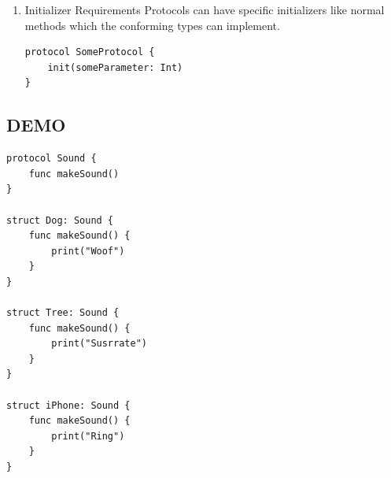 \documentclass[a4paper,12pt]{article}
\begin{document}
\begin{enumerate}
\begin{lstlisting}
    func area() -> Int {
        return width * height
    }

    mutating func scaleBy(value: Int) {
        width *= value
        height *= value
    }
}
\end{lstlisting}
The scaleBy(value:) method modifies the value of width and height. So it should be marked as mutating. Otherwise the compiler will throw error at you.\\

\begin{verse}
If you mark a protocol instance method requirement as mutating, you do not need to write the mutatingkeyword when writing an implementation of that method for a class. The mutating keyword is only used by structures and enumerations.\\
\end{verse}
Consider an enum and class implementing a protocol with mutating function:\\
\lstset{breaklines=true,language=swift,label= ,caption= ,captionpos=b,firstnumber=1,numbers=left}
\begin{lstlisting}
protocol Togglable {
    mutating func toggle()
}

enum OnOffSwitch: Toggglable {
    case off, on
    mutating func toggle() {
        switch self {
        case .off:
            self = .on
        case .on:
            self = .off
        }
    }
}

var lightSwitch = OnOffSwitch.off
lightSwitch.toggle()

class ToggleClass: Togglable {
    var someBool = false
    func toggle() {
        someBool = true
    }
}

let toggleClassObj = ToggleClass()
toggleClassObj.toggle()
\end{lstlisting}
\item Initializer Requirements
\label{sec:org9c66597}
Protocols can have specific initializers like normal methods which the conforming types can implement.\\
\lstset{breaklines=true,language=swift,label= ,caption= ,captionpos=b,firstnumber=1,numbers=left}
\begin{lstlisting}
protocol SomeProtocol {
    init(someParameter: Int)
}
\end{lstlisting}
\end{enumerate}
\subsection{DEMO}
\label{sec:org8be615d}
\lstset{breaklines=true,language=swift,label= ,caption= ,captionpos=b,firstnumber=1,numbers=left}
\begin{lstlisting}
protocol Sound {
    func makeSound()
}

struct Dog: Sound {
    func makeSound() {
        print("Woof")
    }
}

struct Tree: Sound {
    func makeSound() {
        print("Susrrate")
    }
}

struct iPhone: Sound {
    func makeSound() {
        print("Ring")
    }
}
\end{lstlisting}
\end{document}
